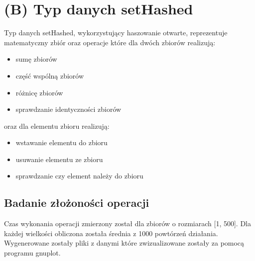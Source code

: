 \documentclass{article}
\begin{document}
\section*{(B) Typ danych setHashed}
 Typ danych setHashed, wykorzystujący haszowanie otwarte, reprezentuje\\ matematyczny zbiór oraz operacje które dla dwóch zbiorów realizują: 
\begin{itemize} 
    \item sumę zbiorów
    \item część wspólną zbiorów
    \item różnicę zbiorów
    \item sprawdzanie identyczności zbiorów
\end{itemize}
oraz dla elementu zbioru realizują: 
\begin{itemize}
    \item wstawanie elementu do zbioru
    \item usuwanie elementu ze zbioru
    \item sprawdzanie czy element należy do zbioru
\end{itemize}

\subsection*{Badanie złożoności operacji}
 Czas wykonania operacji zmierzony został dla zbiorów o rozmiarach [1, 500]. Dla każdej wielkości obliczona została średnia z 1000 powtórzeń działania. Wygenerowane zostały pliki z danymi które zwizualizowane zostały za pomocą programu gnuplot.
\end{document}
